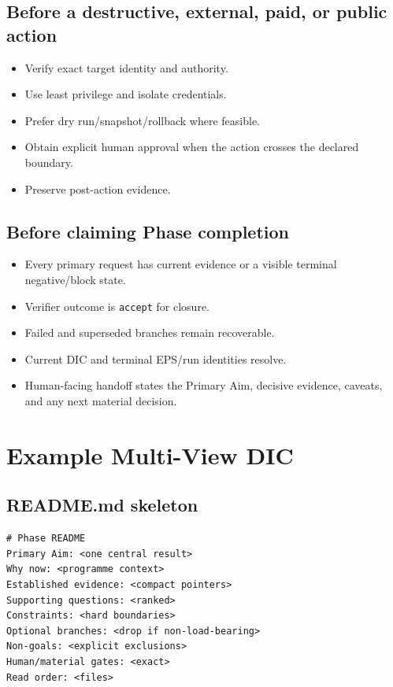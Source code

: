 \documentclass[11pt,a4paper]{article}
\begin{document}
\subsection{Before a destructive, external, paid, or public action}
\begin{itemize}
\item Verify exact target identity and authority.
\item Use least privilege and isolate credentials.
\item Prefer dry run/snapshot/rollback where feasible.
\item Obtain explicit human approval when the action crosses the declared boundary.
\item Preserve post-action evidence.
\end{itemize}

\subsection{Before claiming Phase completion}
\begin{itemize}
\item Every primary request has current evidence or a visible terminal negative/block state.
\item Verifier outcome is \texttt{accept} for closure.
\item Failed and superseded branches remain recoverable.
\item Current DIC and terminal EPS/run identities resolve.
\item Human-facing handoff states the Primary Aim, decisive evidence, caveats, and any next material decision.
\end{itemize}

\section{Example Multi-View DIC}\label{sec:dic-example}
\subsection*{README.md skeleton}
\begin{lstlisting}[style=workflow]
# Phase README
Primary Aim: <one central result>
Why now: <programme context>
Established evidence: <compact pointers>
Supporting questions: <ranked>
Constraints: <hard boundaries>
Optional branches: <drop if non-load-bearing>
Non-goals: <explicit exclusions>
Human/material gates: <exact>
Read order: <files>
\end{lstlisting}
\end{document}
